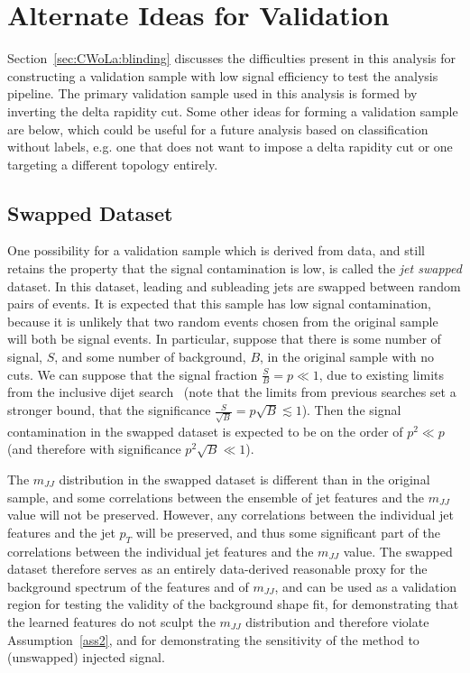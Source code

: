 \section{Alternate Ideas for Validation}
\label{app:CWoLa:validation_alternate}
Section~\ref{sec:CWoLa:blinding} discusses the difficulties present in this analysis for constructing a validation sample with low signal efficiency to test the analysis pipeline.
The primary validation sample used in this analysis is formed by inverting the delta rapidity cut.
Some other ideas for forming a validation sample are below, which could be useful for a future analysis based on classification without labels, e.g. one that does not want to impose a delta rapidity cut or one targeting a different topology entirely.

\subsection{Swapped Dataset}
One possibility for a validation sample which is derived from data, and still retains the property that the signal contamination is low, is called the \textit{jet swapped} dataset.
In this dataset, leading and subleading jets are swapped between random pairs of events.
It is expected that this sample has low signal contamination, because it is unlikely that two random events chosen from the original sample will both be signal events.
In particular, suppose that there is some number of signal, $S$, and some number of background, $B$, in the original sample with no cuts.
We can suppose that the signal fraction $\frac{S}{B} = p\ll1$, due to existing limits from the inclusive dijet search~\cite{Aad:2019hjw} (note that the limits from previous searches set a stronger bound, that the significance $\frac{S}{\sqrt{B}}=p\sqrt{B} \lesssim 1$).
Then the signal contamination in the swapped dataset is expected to be on the order of $p^2 \ll p$ (and therefore with significance $p^2\sqrt{B} \ll 1$).

The $m_{JJ}$ distribution in the swapped dataset is different than in the original sample, and some correlations between the ensemble of jet features and the $m_{JJ}$ value will not be preserved.
However, any correlations between the individual jet features and the jet $p_T$ will be preserved, and thus some significant part of the correlations between the individual jet features and the $m_{JJ}$ value.
The swapped dataset therefore serves as an entirely data-derived reasonable proxy for the background spectrum of the features and of $m_{JJ}$, and can be used as a validation region for testing the validity of the background shape fit, for demonstrating that the learned features do not sculpt the $m_{JJ}$ distribution and therefore violate Assumption~\ref{ass2}, and for demonstrating the sensitivity of the method to (unswapped) injected signal.

